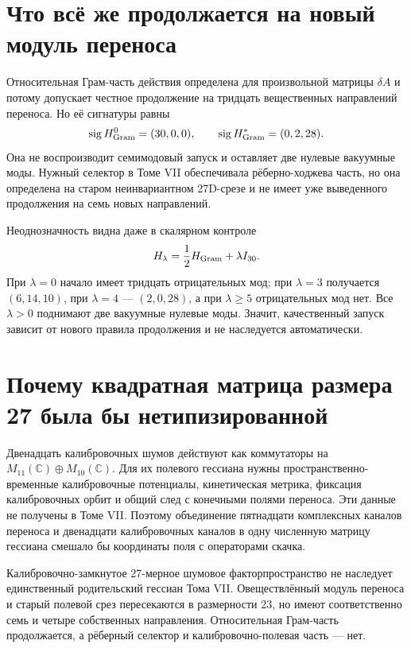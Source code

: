 \section{Что всё же продолжается на новый модуль переноса}

Относительная Грам-часть действия определена для произвольной матрицы
$\delta A$ и потому допускает честное продолжение на тридцать вещественных
направлений переноса. Но её сигнатуры равны
\begin{equation}
 \operatorname{sig}H_{\rm Gram}^{0}=(30,0,0),
 \qquad
 \operatorname{sig}H_{\rm Gram}^{*}=(0,2,28).
 \label{eq:v8-relative-gram-on-full-transfer}
\end{equation}
Она не воспроизводит семимодовый запуск и оставляет две нулевые вакуумные
моды. Нужный селектор в Томе VII обеспечивала рёберно-ходжева часть, но она
определена на старом неинвариантном 27D-срезе и не имеет уже выведенного
продолжения на семь новых направлений.

Неоднозначность видна даже в скалярном контроле
\begin{equation}
 H_{\lambda}=\frac12H_{\rm Gram}+\lambda I_{30}.
 \label{eq:v8-undetermined-transfer-mass-completion}
\end{equation}
При $\lambda=0$ начало имеет тридцать отрицательных мод; при $\lambda=3$
получается $(6,14,10)$, при $\lambda=4$ --- $(2,0,28)$, а при
$\lambda\geq5$ отрицательных мод нет. Все $\lambda>0$ поднимают две
вакуумные нулевые моды. Значит, качественный запуск зависит от нового
правила продолжения и не наследуется автоматически.

\section{Почему квадратная матрица размера 27 была бы нетипизированной}

Двенадцать калибровочных шумов действуют как коммутаторы на
$M_{11}(\mathbb C)\oplus M_{10}(\mathbb C)$. Для их полевого гессиана нужны
пространственно-временные калибровочные потенциалы, кинетическая метрика, фиксация
калибровочных орбит и общий след с конечными полями переноса. Эти данные не получены
в Томе VII. Поэтому объединение пятнадцати комплексных каналов переноса и
двенадцати калибровочных каналов в одну численную матрицу гессиана смешало бы
координаты поля с операторами скачка.

\begin{theorem}
Калибровочно-замкнутое 27-мерное шумовое факторпространство не наследует единственный
родительский гессиан Тома VII. Овеществлённый модуль переноса и старый полевой
срез пересекаются в размерности 23, но имеют соответственно семь и четыре
собственных направления. Относительная Грам-часть продолжается, а
рёберный селектор и калибровочно-полевая часть --- нет.
\end{theorem}

